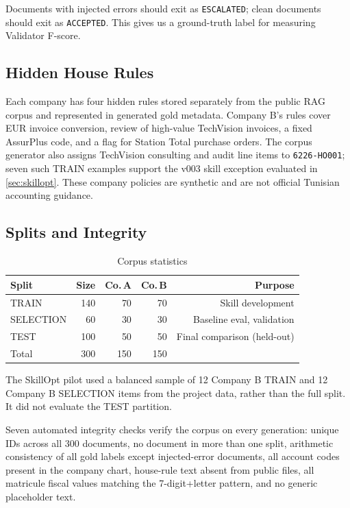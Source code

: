 Documents with injected errors should exit as \texttt{ESCALATED}; clean documents
should exit as \texttt{ACCEPTED}. This gives us a ground-truth label for measuring
Validator F-score.

\subsection{Hidden House Rules}

Each company has four hidden rules stored separately from the public RAG corpus
and represented in generated gold metadata. Company B's rules cover EUR invoice
conversion, review of high-value TechVision invoices, a fixed AssurPlus code,
and a flag for Station Total purchase orders. The corpus generator also assigns
TechVision consulting and audit line items to \texttt{6226-HO001}; seven such
TRAIN examples support the v003 skill exception evaluated in
\cref{sec:skillopt}. These company policies are synthetic and are not official
Tunisian accounting guidance.

\subsection{Splits and Integrity}

\begin{table}[ht]
\caption{Corpus statistics}
\label{tab:corpus}
\centering\scriptsize\renewcommand{\arraystretch}{1.2}
\begin{tabular}{@{}lrrrr@{}}
\toprule
\textbf{Split} & \textbf{Size} & \textbf{Co.\,A} & \textbf{Co.\,B} & \textbf{Purpose} \\
\midrule
TRAIN     & 140 & 70 & 70 & Skill development \\
SELECTION & 60  & 30 & 30 & Baseline eval, validation \\
TEST      & 100 & 50 & 50 & Final comparison (held-out) \\
\midrule
Total & 300 & 150 & 150 & \\
\bottomrule
\end{tabular}
\end{table}

The SkillOpt pilot used a balanced sample of 12 Company B TRAIN and 12 Company B
SELECTION items from the project data, rather than the full split. It did not
evaluate the TEST partition.

Seven automated integrity checks verify the corpus on every generation:
unique IDs across all 300 documents, no document in more than one split,
arithmetic consistency of all gold labels except injected-error documents,
all account codes present in the company chart, house-rule text absent from
public files, all matricule fiscal values matching the 7-digit+letter pattern,
and no generic placeholder text.
